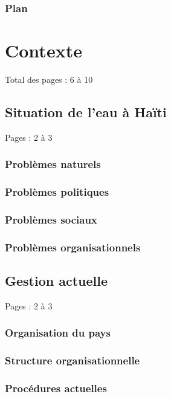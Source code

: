 \documentclass{eplmastersthesis_FR}
\begin{document}
		\subsection*{Plan}

	\chapter{Contexte}

		Total des pages : 6 à 10

		\section{Situation de l'eau à Haïti}

			Pages : 2 à 3

			\subsection*{Problèmes naturels}
			\subsection*{Problèmes politiques}
			\subsection*{Problèmes sociaux}
			\subsection*{Problèmes organisationnels}

		\section{Gestion actuelle}

			Pages : 2 à 3

			\subsection*{Organisation du pays}
			\subsection*{Structure organisationnelle}
			\subsection*{Procédures actuelles}
\end{document}
